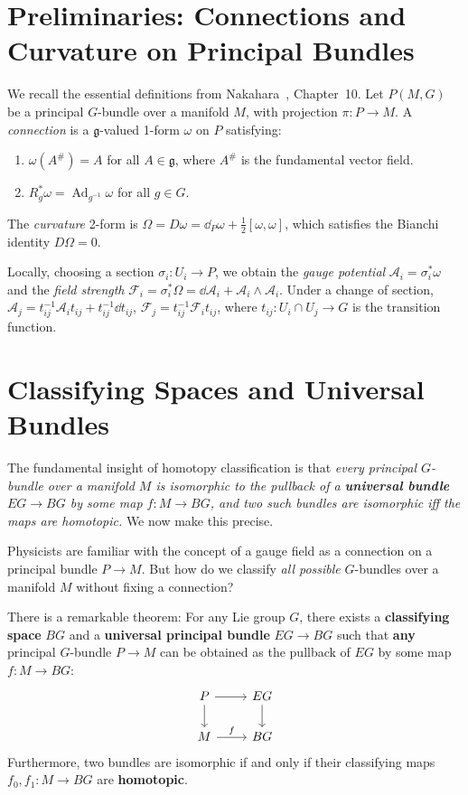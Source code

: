 \documentclass[11pt]{article}
\newcommand{\Ad}{\operatorname{Ad}}    %
\newcommand{\cA}{\mathcal{A}}
\newcommand{\cF}{\mathcal{F}}
\newcommand{\g}{\mathfrak{g}}
\begin{document}
\section{Preliminaries: Connections and Curvature on Principal Bundles}
\label{sec:connections}
We recall the essential definitions from Nakahara~\cite{Nakahara}, Chapter~10. Let \(P(M,G)\) be a principal \(G\)-bundle over a manifold \(M\), with projection \(\pi:P\to M\). A \emph{connection} is a \(\g\)-valued 1-form \(\omega\) on \(P\) satisfying:
\begin{enumerate}
    \item \(\omega(A^\#)=A\) for all \(A\in\g\), where \(A^\#\) is the fundamental vector field.
    \item \(R_g^*\omega = \Ad_{g^{-1}}\omega\) for all \(g\in G\).
\end{enumerate}
The \emph{curvature} 2-form is \(\Omega = D\omega = \dd_P\omega + \frac{1}{2}[\omega,\omega]\), which satisfies the Bianchi identity \(D\Omega=0\).

Locally, choosing a section \(\sigma_i:U_i\to P\), we obtain the \emph{gauge potential} \(\cA_i = \sigma_i^*\omega\) and the \emph{field strength} \(\cF_i = \sigma_i^*\Omega = \dd\cA_i + \cA_i\wedge\cA_i\). Under a change of section, \(\cA_j = t_{ij}^{-1}\cA_i t_{ij} + t_{ij}^{-1}\dd t_{ij}\), \(\cF_j = t_{ij}^{-1}\cF_i t_{ij}\), where \(t_{ij}:U_i\cap U_j\to G\) is the transition function.

\section{Classifying Spaces and Universal Bundles}
\label{sec:classifying}
The fundamental insight of homotopy classification is that \emph{every principal \(G\)-bundle over a manifold \(M\) is isomorphic to the pullback of a \textbf{universal bundle} \(EG\to BG\) by some map \(f:M\to BG\), and two such bundles are isomorphic iff the maps are homotopic.} We now make this precise.

Physicists are familiar with the concept of a gauge field as a connection on a principal bundle \(P \to M\). But how do we classify \emph{all possible} \(G\)-bundles over a manifold \(M\) without fixing a connection?

There is a remarkable theorem: For any Lie group \(G\), there exists a \textbf{classifying space} \(BG\) and a \textbf{universal principal bundle} \(EG \to BG\) such that \textbf{any} principal \(G\)-bundle \(P \to M\) can be obtained as the pullback of \(EG\) by some map \(f: M \to BG\):
\begin{equation}
\begin{tikzcd}
P \arrow[r] \arrow[d] & EG \arrow[d] \\
M \arrow[r, "f"] & BG
\end{tikzcd}
\end{equation}
Furthermore, two bundles are isomorphic if and only if their classifying maps \(f_0, f_1: M \to BG\) are \textbf{homotopic}. 
\end{document}
